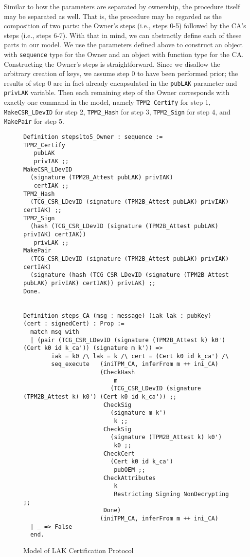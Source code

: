  Similar to how the parameters are separated by ownership, the procedure itself may be separated as well. That is, the procedure may be regarded as the composition of two parts: the Owner's steps (i.e., steps 0-5) followed by the CA's steps (i.e., steps 6-7).
 With that in mind, we can abstractly define each of these parts in our model. We use the parameters defined above to construct an object with \verb|sequence| type for the Owner and an object with function type for the CA. Constructing the Owner's steps is straightforward. Since we disallow the arbitrary creation of keys, we assume step 0 to have been performed prior; the results of step 0 are in fact already encapsulated in the \verb|pubLAK| parameter and \verb|privLAK| variable. Then each remaining step of the Owner corresponds with exactly one command in the model, namely \verb|TPM2_Certify| for step 1, \verb|MakeCSR_LDevID| for step 2, \verb|TPM2_Hash| for step 3, \verb|TPM2_Sign| for step 4, and \verb|MakePair| for step 5. 
\begin{figure}[h!]
\begin{lstlisting}[language=Coq]
Definition steps1to5_Owner : sequence :=
TPM2_Certify 
   pubLAK 
   privIAK ;;
MakeCSR_LDevID 
  (signature (TPM2B_Attest pubLAK) privIAK) 
   certIAK ;;
TPM2_Hash 
  (TCG_CSR_LDevID (signature (TPM2B_Attest pubLAK) privIAK) certIAK) ;;
TPM2_Sign 
  (hash (TCG_CSR_LDevID (signature (TPM2B_Attest pubLAK) privIAK) certIAK)) 
   privLAK ;;
MakePair 
  (TCG_CSR_LDevID (signature (TPM2B_Attest pubLAK) privIAK) certIAK) 
  (signature (hash (TCG_CSR_LDevID (signature (TPM2B_Attest pubLAK) privIAK) certIAK)) privLAK) ;;
Done. 


Definition steps_CA (msg : message) (iak lak : pubKey) (cert : signedCert) : Prop :=
  match msg with
  | (pair (TCG_CSR_LDevID (signature (TPM2B_Attest k) k0') (Cert k0 id k_ca')) (signature m k')) =>
        iak = k0 /\ lak = k /\ cert = (Cert k0 id k_ca') /\
        seq_execute   (iniTPM_CA, inferFrom m ++ ini_CA)
                      (CheckHash 
                          m
                         (TCG_CSR_LDevID (signature (TPM2B_Attest k) k0') (Cert k0 id k_ca')) ;;
                       CheckSig
                         (signature m k') 
                          k ;;
                       CheckSig 
                         (signature (TPM2B_Attest k) k0') 
                          k0 ;;
                       CheckCert 
                         (Cert k0 id k_ca') 
                          pubOEM ;;
                       CheckAttributes 
                          k 
                          Restricting Signing NonDecrypting ;;
                       Done)
                      (iniTPM_CA, inferFrom m ++ ini_CA)
  | _ => False
  end.
\end{lstlisting}
\caption{Model of LAK Certification Protocol}
\label{fig:lak_model}
\end{figure}

